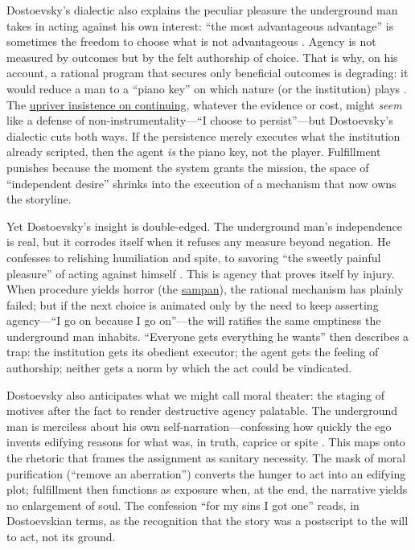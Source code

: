 Dostoevsky's dialectic also explains the peculiar pleasure the underground man takes in acting
against his own interest: ``the most advantageous advantage'' is sometimes the freedom to choose
what is not advantageous \parencite[pp.~129--131]{DostoevskyNFU1994}. Agency is not measured by
outcomes but by the felt authorship of choice. That is why, on his account, a rational program
that secures only beneficial outcomes is degrading: it would reduce a man to a ``piano key'' on
which nature (or the institution) plays \parencite[pp.~115--120]{DostoevskyNFU1994}.
The \hyperref[scene:upriver-journey]{upriver insistence on continuing}, whatever the evidence or
cost, might \emph{seem} like a defense of non-instrumentality—``I choose to persist''—but
Dostoevsky's dialectic cuts both ways. If the persistence merely executes what the institution
already scripted, then the agent \emph{is} the piano key, not the player. Fulfillment punishes
because the moment the system grants the mission, the space of ``independent desire'' shrinks
into the execution of a mechanism that now owns the storyline.

Yet Dostoevsky's insight is double-edged. The underground man's independence is real, but it
corrodes itself when it refuses any measure beyond negation. He confesses to relishing
humiliation and spite, to savoring ``the sweetly painful pleasure'' of acting against himself
\parencite[pp.~108--115]{DostoevskyNFU1994}. This is agency that proves itself by injury.
When procedure yields horror (the \hyperref[scene:sampan]{sampan}), the rational mechanism has
plainly failed; but if
the next choice is animated only by the need to keep asserting agency—``I go on because I go
on''—the will ratifies the same emptiness the underground man inhabits. ``Everyone gets
everything he wants'' then describes a trap: the institution gets its obedient executor; the
agent gets the feeling of authorship; neither gets a norm by which the act could be vindicated.

Dostoevsky also anticipates what we might call moral theater: the staging of motives after the
fact to render destructive agency palatable. The underground man is merciless about his own
self-narration—confessing how quickly the ego invents edifying reasons for what was, in truth,
caprice or spite \parencite[pp.~103--107]{DostoevskyNFU1994}. This maps onto the rhetoric that
frames the assignment as sanitary necessity. The mask of moral purification (``remove an
aberration'') converts the hunger to act into an edifying plot; fulfillment then functions as
exposure when, at the end, the narrative yields no enlargement of soul. The confession ``for my
sins I got one'' reads, in Dostoevskian terms, as the recognition that the story was a postscript
to the will to act, not its ground.


